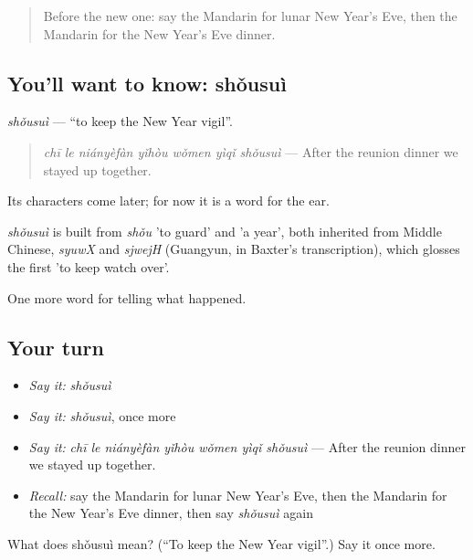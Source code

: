 \begin{quote}
Before the new one: say the Mandarin for lunar New Year's Eve, then the Mandarin for the New Year's Eve dinner.
\end{quote}

\subsection*{You'll want to know: shǒusuì}
\emph{shǒusuì} — \textquotedblleft{}to keep the New Year vigil\textquotedblright{}.

\begin{quote}
\emph{chī le niányèfàn yǐhòu wǒmen yìqǐ shǒusuì} — After the reunion dinner we stayed up together.
\end{quote}

Its characters come later; for now it is a word for the ear.

\begin{cousinweb}
\emph{shǒusuì} is built from \emph{shǒu} 'to guard' and  'a year', both inherited from Middle Chinese, \emph{syuwX} and \emph{sjwejH} (Guangyun, in Baxter's transcription), which glosses the first 'to keep watch over'.
\end{cousinweb}

\begin{grammarlens}[title={What you've built}]
One more word for telling what happened.
\end{grammarlens}

\subsection*{Your turn}
\begin{itemize}
\raggedright
  \item \emph{Say it:} \emph{shǒusuì}
  \item \emph{Say it:} \emph{shǒusuì}, once more
  \item \emph{Say it:} \emph{chī le niányèfàn yǐhòu wǒmen yìqǐ shǒusuì} — After the reunion dinner we stayed up together.
  \item \emph{Recall:} say the Mandarin for lunar New Year's Eve, then the Mandarin for the New Year's Eve dinner, then say \emph{shǒusuì} again
\end{itemize}

\begin{tcolorbox}[breakable,colback=teal!4,colframe=teal!35!black,title={Before you move on}]
What does shǒusuì mean? (\textquotedblleft{}To keep the New Year vigil\textquotedblright{}.) Say it once more.
\end{tcolorbox}
